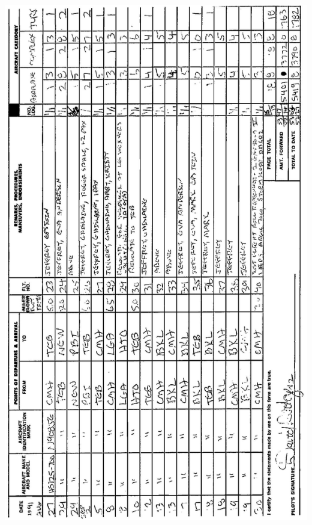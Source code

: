 \documentclass[10pt]{article}
\begin{document}
\includegraphics[max width=\textwidth, center]{2025_02_27_dd68c3d38de88f0516d9g-007}\\
\end{document}
